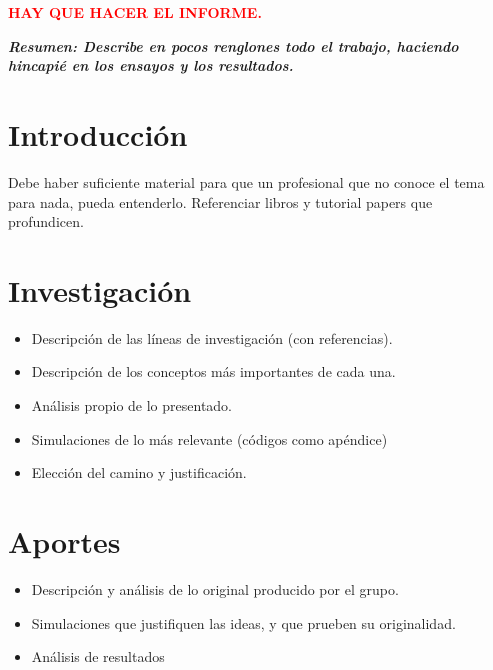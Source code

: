 








\begin{center}
	\Huge{\textcolor{red}{\textbf{HAY QUE HACER EL INFORME.}}}
\end{center}

\textbf{\textit{Resumen: Describe en pocos renglones todo el trabajo, haciendo hincapié en los ensayos y los resultados.}}

\section{Introducción}
	Debe haber suficiente material para que un profesional que no conoce el tema para nada, pueda entenderlo. Referenciar libros y tutorial papers que profundicen.
	
\section{Investigación}
\begin{itemize}
	\item Descripción de las líneas de investigación (con referencias).
	\item Descripción de los conceptos más importantes de cada una.
	\item Análisis propio de lo presentado.
	\item Simulaciones de lo más relevante (códigos como apéndice)
	\item Elección del camino y justificación.
\end{itemize}

\section{Aportes}
\begin{itemize}
	\item Descripción y análisis de lo original producido por el grupo.
	\item Simulaciones que justifiquen las ideas, y que prueben su originalidad.
	\item Análisis de resultados
\end{itemize}

